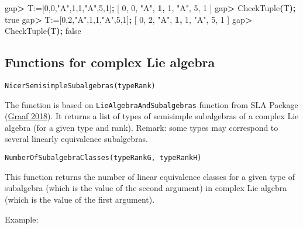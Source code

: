 \documentclass[
]{article}
\newenvironment{Shaded}{\begin{snugshade}}{\end{snugshade}}
\newcommand{\BuiltInTok}[1]{#1}
\newcommand{\ErrorTok}[1]{\textcolor[rgb]{0.64,0.00,0.00}{\textbf{#1}}}
\newcommand{\ExtensionTok}[1]{#1}
\newcommand{\FunctionTok}[1]{\textcolor[rgb]{0.00,0.00,0.00}{#1}}
\newcommand{\KeywordTok}[1]{\textcolor[rgb]{0.13,0.29,0.53}{\textbf{#1}}}
\newcommand{\NormalTok}[1]{#1}
\newcommand{\OperatorTok}[1]{\textcolor[rgb]{0.81,0.36,0.00}{\textbf{#1}}}
\newcommand{\StringTok}[1]{\textcolor[rgb]{0.31,0.60,0.02}{#1}}
\begin{document}
\begin{Shaded}
\begin{Highlighting}[]
\ExtensionTok{gap}\OperatorTok{\textgreater{}}\NormalTok{ T:=[0,0,}\StringTok{"A"}\NormalTok{,1,1,}\StringTok{"A"}\NormalTok{,5,1]}\KeywordTok{;}
\BuiltInTok{[}\NormalTok{ 0, 0, }\StringTok{"A"}\NormalTok{, }\ErrorTok{1,}\NormalTok{ 1, }\StringTok{"A"}\NormalTok{, 5, 1 ]}
\ExtensionTok{gap}\OperatorTok{\textgreater{}}\NormalTok{ CheckTuple}\ErrorTok{(}\ExtensionTok{T}\KeywordTok{);}
\FunctionTok{true}
\ExtensionTok{gap}\OperatorTok{\textgreater{}}\NormalTok{ T:=[0,2,}\StringTok{"A"}\NormalTok{,1,1,}\StringTok{"A"}\NormalTok{,5,1]}\KeywordTok{;}
\BuiltInTok{[}\NormalTok{ 0, 2, }\StringTok{"A"}\NormalTok{, }\ErrorTok{1,}\NormalTok{ 1, }\StringTok{"A"}\NormalTok{, 5, 1 ]}
\ExtensionTok{gap}\OperatorTok{\textgreater{}}\NormalTok{ CheckTuple}\ErrorTok{(}\ExtensionTok{T}\KeywordTok{);}
\FunctionTok{false}
\end{Highlighting}
\end{Shaded}

\hypertarget{functions-for-complex-lie-algebra}{%
\subsection{Functions for complex Lie
algebra}\label{functions-for-complex-lie-algebra}}

\begin{verbatim}
NicerSemisimpleSubalgebras(typeRank)
\end{verbatim}

The function is based on \texttt{LieAlgebraAndSubalgebras} function from
SLA Package (\protect\hyperlink{ref-sla}{Graaf 2018}). It returns a list
of types of semisimple subalgebras of a complex Lie algebra (for a given
type and rank). Remark: some types may correspond to several linearly
equivalence subalgebras.

\begin{verbatim}
NumberOfSubalgebraClasses(typeRankG, typeRankH)
\end{verbatim}

This function returns the number of linear equivalence classes for a
given type of subalgebra (which is the value of the second argument) in
complex Lie algebra (which is the value of the first argument).

Example:
\end{document}
